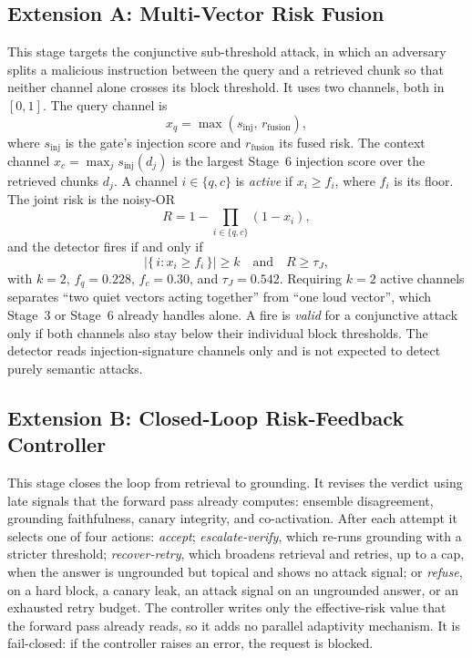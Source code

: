 \documentclass[conference]{IEEEtran}
\begin{document}
\subsection{Extension A: Multi-Vector Risk Fusion}
This stage targets the conjunctive sub-threshold attack, in which an adversary splits a malicious instruction between the query and a retrieved chunk so that neither channel alone crosses its block threshold. It uses two channels, both in $[0,1]$. The query channel is
\begin{equation}
x_q = \max\left(s_{\mathrm{inj}},\, r_{\mathrm{fusion}}\right),
\label{eq:query}
\end{equation}
where $s_{\mathrm{inj}}$ is the gate's injection score and $r_{\mathrm{fusion}}$ its fused risk. The context channel $x_c=\max_j s_{\mathrm{inj}}(d_j)$ is the largest Stage~6 injection score over the retrieved chunks $d_j$. A channel $i\in\{q,c\}$ is \emph{active} if $x_i \ge f_i$, where $f_i$ is its floor. The joint risk is the noisy-OR
\begin{equation}
R = 1 - \prod_{i \in \{q,c\}} (1 - x_i),
\label{eq:noisyor}
\end{equation}
and the detector fires if and only if
\begin{equation}
\bigl|\{\, i : x_i \ge f_i \,\}\bigr| \ge k \quad\text{and}\quad R \ge \tau_J ,
\label{eq:fire}
\end{equation}
with $k=2$, $f_q=0.228$, $f_c=0.30$, and $\tau_J=0.542$. Requiring $k=2$ active channels separates ``two quiet vectors acting together'' from ``one loud vector'', which Stage~3 or Stage~6 already handles alone. A fire is \emph{valid} for a conjunctive attack only if both channels also stay below their individual block thresholds. The detector reads injection-signature channels only and is not expected to detect purely semantic attacks.

\subsection{Extension B: Closed-Loop Risk-Feedback Controller}
This stage closes the loop from retrieval to grounding. It revises the verdict using late signals that the forward pass already computes: ensemble disagreement, grounding faithfulness, canary integrity, and co-activation. After each attempt it selects one of four actions: \emph{accept}; \emph{escalate-verify}, which re-runs grounding with a stricter threshold; \emph{recover-retry}, which broadens retrieval and retries, up to a cap, when the answer is ungrounded but topical and shows no attack signal; or \emph{refuse}, on a hard block, a canary leak, an attack signal on an ungrounded answer, or an exhausted retry budget. The controller writes only the effective-risk value that the forward pass already reads, so it adds no parallel adaptivity mechanism. It is fail-closed: if the controller raises an error, the request is blocked.
\end{document}
